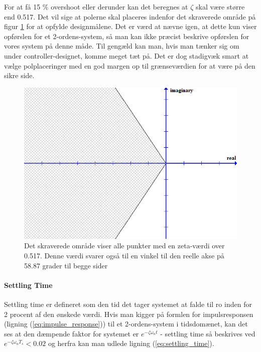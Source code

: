 For at få 15 $\%$ overshoot eller derunder kan det beregnes at $\zeta$ skal være større end 0.517. Det vil sige at polerne skal placeres indenfor det skraverede område på figur \ref{fig:Overshoot} for at opfylde designmålene. Det er værd at nævne igen, at dette kun viser opførslen for et 2-ordens-system, så man kan ikke præcist beskrive opførslen for vores system på denne måde. Til gengæld kan man, hvis man tænker sig om under controller-designet, komme meget tæt på. Det er dog stadigvæk smart at vælge polplaceringer med en god margen op til grænseværdien for at være på den sikre side.

\begin{figure}[h]
	\begin{center}
		\includegraphics[scale=0.5]{Billeder/Overshoot.PNG}
	\end{center}
\caption{Det skraverede område viser alle punkter med en zeta-værdi over 0.517. Denne værdi svarer også til en vinkel til den reelle akse på 58.87 grader til begge sider}
\label{fig:Overshoot}
\end{figure}

\paragraph{Settling Time}

Settling time er defineret som den tid det tager systemet at falde til ro inden for 2 procent af den ønskede værdi. Hvis man kigger på formlen for impulsresponsen (ligning (\ref{eq:impulse_response}))  til et 2-ordens-system i tidsdomænet, kan det ses at den dæmpende faktor for systemet er $e^{-\zeta\omega_{n}t}$ - settling time så beskrives ved $e^{-\zeta\omega_{n}T_{s}}<0.02$ og herfra kan man udlede ligning (\ref{eq:settling_time}).

